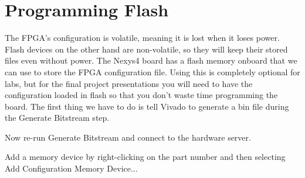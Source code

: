 \section{Programming Flash}
The FPGA's configuration is volatile, meaning it is lost when it loses power.
Flash devices on the other hand are non-volatile, so they will keep their stored files even
without power.
The Nexys4 board has a flash memory onboard that we can use to store the FPGA configuration file.
Using this is completely optional for labs, but for the final project presentations you will need
to have the configuration loaded in flash so that you don't waste time programming the board.
The first thing we have to do is tell Vivado to generate a bin file during the Generate
Bitstream step.


Now re-run Generate Bitstream and connect to the hardware server.


Add a memory device by right-clicking on the part number and then selecting Add Configuration
Memory Device...